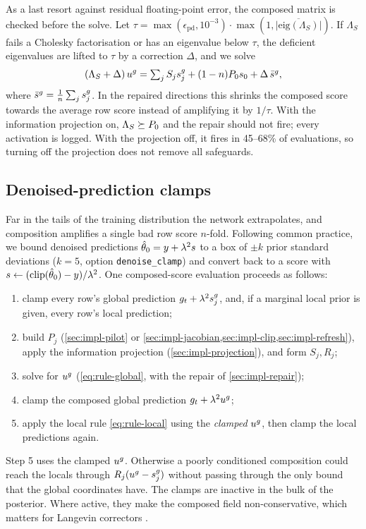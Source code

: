 As a last resort against residual floating-point error, the composed matrix is checked before the solve.
Let $\tau=\max(\epsilon_\mathrm{pd},10^{-3})\cdot\max(1,\overline{|\mathrm{eig}(\Lambda_S)|})$.
If $\Lambda_S$ fails a Cholesky factorisation or has an eigenvalue below $\tau$, the deficient eigenvalues are lifted to $\tau$ by a correction $\Delta$, and we solve
\[
  (\Lambda_S+\Delta)\,u^{g}=\textstyle\sum_jS_js_j^{g}+(1-n)P_{0} s_0+\Delta\,\bar s^g,
\]
where $\bar s^g=\tfrac1n\sum_js_j^{g}$.
In the repaired directions this shrinks the composed score towards the average row score instead of amplifying it by $1/\tau$.
With the information projection on, $\Lambda_S\succeq P_{0}$ and the repair should not fire; every activation is logged.
With the projection off, it fires in 45--68\% of evaluations, so turning off the projection does not remove all safeguards.

\subsection{Denoised-prediction clamps}\label{sec:impl-clamps}

Far in the tails of the training distribution the network extrapolates, and composition amplifies a single bad row score $n$-fold.
Following common practice, we bound denoised predictions $\hat\theta_0=y+\lambda^2s$ to a box of $\pm k$ prior standard deviations ($k=5$, option \texttt{denoise\_clamp}) and convert back to a score with $s\leftarrow(\operatorname{clip}(\hat\theta_0)-y)/\lambda^2$.
One composed-score evaluation proceeds as follows:
\begin{enumerate}
  \item clamp every row's global prediction $g_t+\lambda^2s_j^{g}$, and, if a marginal local prior is given, every row's local prediction;
  \item build $P_j$ (\cref{sec:impl-pilot} or \cref{sec:impl-jacobian,sec:impl-clip,sec:impl-refresh}), apply the information projection (\cref{sec:impl-projection}), and form $S_j,R_j$;
  \item solve for $u^{g}$ (\cref{eq:rule-global}, with the repair of \cref{sec:impl-repair});
  \item clamp the composed global prediction $g_t+\lambda^2u^{g}$;
  \item apply the local rule \cref{eq:rule-local} using the \emph{clamped} $u^{g}$, then clamp the local predictions again.
\end{enumerate}
Step 5 uses the clamped $u^{g}$.
Otherwise a poorly conditioned composition could reach the locals through $R_j(u^{g}-s_j^{g})$ without passing through the only bound that the global coordinates have.
The clamps are inactive in the bulk of the posterior.
Where active, they make the composed field non-conservative, which matters for Langevin correctors .

